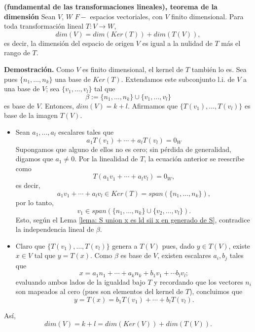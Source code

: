 \begin{teo}
	\label{teo: fundamental de las transf lineales}
\textbf{(fundamental de las transformaciones lineales), 
\textbf{teorema de la dimensión}}
Sean $V$, $W$ $F-$ espacios vectoriales, con $V$
finito dimensional.
Para toda
transformación lineal $T: V \longrightarrow W$,
\begin{equation}
	\label{eq: dim de V es nulidad mas rango}
	dim(V) = dim(Ker(T)) + dim(T(V)),
\end{equation}
es decir, la dimensión del espacio de origen $V$
es igual a la nulidad de $T$ más el rango de $T$.
\end{teo}
\noindent
\textbf{Demostración.}
Como $V$ es finito dimensional, el kernel de $T$ también lo es.
Sea pues $\{ n_{1}, \ldots, n_{k} \}$ una base de $Ker(T)$.
Extendamos este subconjunto l.i. de $V$ a una base de $V$;
sea $\{ v_{1}, \ldots , v_{l} \}$ tal que 
\[
\beta :=
\{ n_{1}, \ldots , n_{k} \} \cup \{ v_{1}, \ldots , v_{l} \}
\]
es base de $V$. Entonces, $dim(V) = k+l$.
Afirmamos que 
$\{ T(v_{1}), \ldots, T(v_{l}) \}$
es base de la imagen $T(V)$.
\begin{itemize}
	\item Sean $a_{1}, \ldots, a_{l}$ escalares tales que
	\[
	a_{1} T(v_{1}) + \cdots + a_{l} T(v_{l}) = 0_{W}
	\]
	Supongamos que alguno de ellos no es cero; sin pérdida de
	generalidad, digamos que $a_{1} \neq 0$. Por la linealidad
	de $T$, la ecuación anterior se reescribe como
	\[
	T(a_{1}v_{1} + \cdots + a_{l}v_{l}) = 0_{W},
	\]
	es decir,
	\[
	a_{1}v_{1} + \cdots + a_{l}v_{l} \in Ker(T) =
	span(\{ n_{1}, \ldots , n_{k} \}),
	\]
	por lo tanto, 
	\[
	v_{1} \in span(\{ n_{1}, \ldots , n_{k} \}
	\cup \{ v_{2}, \ldots , v_{l} \}).
	\]
	Esto, según el Lema 
	\ref{lema: S union x es ld sii x en generado de S}, contradice
	la independencia lineal de $\beta$.
	\item Claro que $\{ T(v_{1}), \ldots, T(v_{l}) \}$
	genera a $T(V)$ pues, dado $y \in T(V)$, existe 
	$x \in V$ tal que $y = T(x)$. Como $\beta$ es base de $V$,
	existen escalares $a_{i}, b_{j}$ tales que 
	\[
	x = a_{1} n_{1} + \cdots + a_{k} n_{k} + 
	b_{1}v_{1} + \cdots b_{l}v_{l};
	\]
	evaluando ambos lados de la igualdad bajo $T$ y recordando
	que los vectores $n_{i}$ son mapeados al cero (pues 
	son elementos del kernel de $T$), concluimos que
	\[
	y = T(x) = b_{1}T(v_{1}) + \cdots + b_{l}T(v_{l}).
	\]
\end{itemize}
Así, 
\[
dim(V) = k + l = dim(Ker(V)) + dim(T(V)).
\] 
\QEDB
\vspace{0.2cm}

